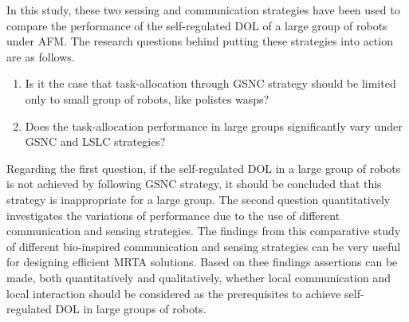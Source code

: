 In this study, these two sensing and communication strategies have been used to compare the performance of the self-regulated DOL of a large group of robots under AFM. %
The research questions behind putting these strategies into action are as follows.
\begin{enumerate}
\item Is it the case that task-allocation through GSNC strategy should be limited only to small group of robots, like polistes wasps?
\item 
Does the task-allocation performance in large groups significantly vary under GSNC and LSLC strategies?
\end{enumerate}
Regarding the first question, if the self-regulated DOL in a large group of robots is not achieved by following GSNC strategy, it should be concluded that this strategy is inappropriate for a large group. The second question quantitatively investigates the variations of performance due to the use of different communication and sensing strategies. The findings from this comparative study of different bio-inspired communication and sensing strategies can be very useful for designing efficient MRTA solutions. Based on thee findings assertions can be made, both quantitatively and qualitatively, whether local communication and local interaction should be considered as the prerequisites to achieve self-regulated DOL in large groups of robots.
